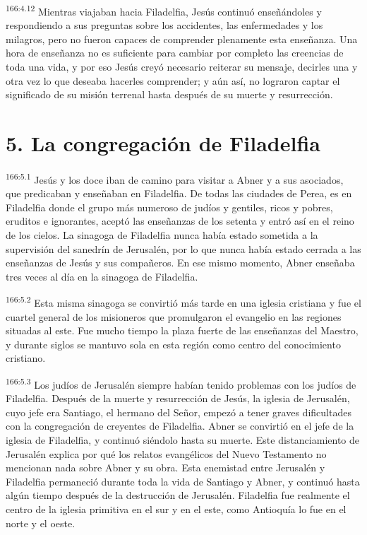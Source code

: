 \par 
\textsuperscript{166:4.12} Mientras viajaban hacia Filadelfia, Jesús continuó enseñándoles y respondiendo a sus preguntas sobre los accidentes, las enfermedades y los milagros, pero no fueron capaces de comprender plenamente esta enseñanza. Una hora de enseñanza no es suficiente para cambiar por completo las creencias de toda una vida, y por eso Jesús creyó necesario reiterar su mensaje, decirles una y otra vez lo que deseaba hacerles comprender; y aún así, no lograron captar el significado de su misión terrenal hasta después de su muerte y resurrección.

\section*{5. La congregación de Filadelfia}
\par 
\textsuperscript{166:5.1} Jesús y los doce iban de camino para visitar a Abner y a sus asociados, que predicaban y enseñaban en Filadelfia. De todas las ciudades de Perea, es en Filadelfia donde el grupo más numeroso de judíos y gentiles, ricos y pobres, eruditos e ignorantes, aceptó las enseñanzas de los setenta y entró así en el reino de los cielos. La sinagoga de Filadelfia nunca había estado sometida a la supervisión del sanedrín de Jerusalén, por lo que nunca había estado cerrada a las enseñanzas de Jesús y sus compañeros. En ese mismo momento, Abner enseñaba tres veces al día en la sinagoga de Filadelfia.

\par 
\textsuperscript{166:5.2} Esta misma sinagoga se convirtió más tarde en una iglesia cristiana y fue el cuartel general de los misioneros que promulgaron el evangelio en las regiones situadas al este. Fue mucho tiempo la plaza fuerte de las enseñanzas del Maestro, y durante siglos se mantuvo sola en esta región como centro del conocimiento cristiano.

\par 
\textsuperscript{166:5.3} Los judíos de Jerusalén siempre habían tenido problemas con los judíos de Filadelfia. Después de la muerte y resurrección de Jesús, la iglesia de Jerusalén, cuyo jefe era Santiago, el hermano del Señor, empezó a tener graves dificultades con la congregación de creyentes de Filadelfia. Abner se convirtió en el jefe de la iglesia de Filadelfia, y continuó siéndolo hasta su muerte. Este distanciamiento de Jerusalén explica por qué los relatos evangélicos del Nuevo Testamento no mencionan nada sobre Abner y su obra. Esta enemistad entre Jerusalén y Filadelfia permaneció durante toda la vida de Santiago y Abner, y continuó hasta algún tiempo después de la destrucción de Jerusalén. Filadelfia fue realmente el centro de la iglesia primitiva en el sur y en el este, como Antioquía lo fue en el norte y el oeste.

